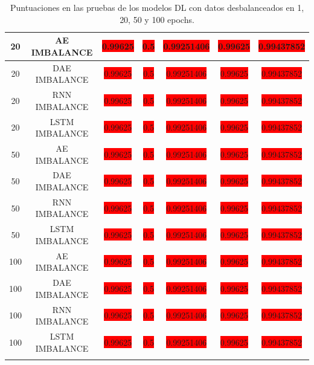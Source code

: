 \begin{longtable}{|c|c|c|c|c|c|c|}
  		20 & AE IMBALANCE & \colorbox{red}{0.99625} & \colorbox{red}{0.5} & \colorbox{red}{0.99251406} & \colorbox{red}{0.99625} & \colorbox{red}{0.99437852}\\ \hline
  		20 & DAE IMBALANCE & \colorbox{red}{0.99625} & \colorbox{red}{0.5} & \colorbox{red}{0.99251406} & \colorbox{red}{0.99625} & \colorbox{red}{0.99437852}\\ \hline
  		20 & RNN IMBALANCE & \colorbox{red}{0.99625} & \colorbox{red}{0.5} & \colorbox{red}{0.99251406} & \colorbox{red}{0.99625} & \colorbox{red}{0.99437852}\\ \hline
  		20 & LSTM IMBALANCE & \colorbox{red}{0.99625} & \colorbox{red}{0.5} & \colorbox{red}{0.99251406} & \colorbox{red}{0.99625} & \colorbox{red}{0.99437852}\\ \hline
  		50 & AE IMBALANCE & \colorbox{red}{0.99625} & \colorbox{red}{0.5} & \colorbox{red}{0.99251406} & \colorbox{red}{0.99625} & \colorbox{red}{0.99437852}\\ \hline
  		50 & DAE IMBALANCE & \colorbox{red}{0.99625} & \colorbox{red}{0.5} & \colorbox{red}{0.99251406} & \colorbox{red}{0.99625} & \colorbox{red}{0.99437852}\\ \hline
  		50 & RNN IMBALANCE & \colorbox{red}{0.99625} & \colorbox{red}{0.5} & \colorbox{red}{0.99251406} & \colorbox{red}{0.99625} & \colorbox{red}{0.99437852}\\ \hline
  		50 & LSTM IMBALANCE & \colorbox{red}{0.99625} & \colorbox{red}{0.5} & \colorbox{red}{0.99251406} & \colorbox{red}{0.99625} & \colorbox{red}{0.99437852}\\ \hline
  		100 & AE IMBALANCE & \colorbox{red}{0.99625} & \colorbox{red}{0.5} & \colorbox{red}{0.99251406} & \colorbox{red}{0.99625} & \colorbox{red}{0.99437852}\\ \hline
  		100 & DAE IMBALANCE & \colorbox{red}{0.99625} & \colorbox{red}{0.5} & \colorbox{red}{0.99251406} & \colorbox{red}{0.99625} & \colorbox{red}{0.99437852}\\ \hline
  		100 & RNN IMBALANCE & \colorbox{red}{0.99625} & \colorbox{red}{0.5} & \colorbox{red}{0.99251406} & \colorbox{red}{0.99625} & \colorbox{red}{0.99437852}\\ \hline
  		100 & LSTM IMBALANCE & \colorbox{red}{0.99625} & \colorbox{red}{0.5} & \colorbox{red}{0.99251406} & \colorbox{red}{0.99625} & \colorbox{red}{0.99437852}\\ \hline
  		\caption{Puntuaciones en las pruebas de los modelos DL con datos desbalanceados en 1, 20, 50 y 100 epochs.}
  		\label{t:4}
  	\end{longtable}

